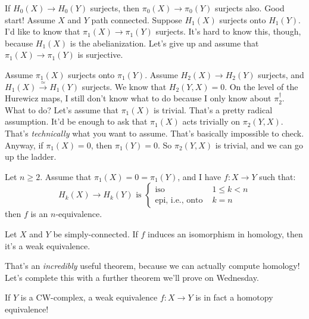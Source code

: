 If $H_0(X)\to H_0(Y)$ surjects, then $\pi_0(X)\to \pi_0(Y)$ surjects also. Good start! Assume $X$ and $Y$ path connected. Suppose $H_1(X)$ surjects onto $H_1(Y)$. I'd like to know that $\pi_1(X)\to\pi_1(Y)$ surjects. It's hard to know this, though, because $H_1(X)$ is the abelianization. Let's give up and assume that $\pi_1(X)\to \pi_1(Y)$ is surjective.

Assume $\pi_1(X)$ surjects onto $\pi_1(Y)$. Assume $H_2(X)\to H_2(Y)$ surjects, and $H_1(X)\xrightarrow{\simeq}H_1(Y)$ surjects. We know that $H_2(Y,X) = 0$. On the level of the Hurewicz maps, I still don't know what to do because I only know about $\pi_2^\dagger$. What to do? Let's assume that $\pi_1(X)$ is trivial. That's a pretty radical assumption. It'd be enough to ask that $\pi_1(X)$ acts trivially on $\pi_2(Y,X)$. That's \emph{technically} what you want to assume. That's basically impossible to check. Anyway, if $\pi_1(X) = 0$, then $\pi_1(Y) = 0$. So $\pi_2(Y,X)$ is trivial, and we can go up the ladder.
\begin{theorem}[J.~H.~C.~Whitehead 2]
    Let $n\geq 2$. Assume that $\pi_1(X) = 0 = \pi_1(Y)$, and I have $f:X\to Y$ such that:
\begin{equation*}
H_k(X)\to H_k(Y) \text{ is }\begin{cases}
\text{iso } & 1\leq k<n\\
\text{epi, i.e., onto } & k = n
\end{cases}
\end{equation*}
then $f$ is an $n$-equivalence.
\end{theorem}
\begin{corollary}
    Let $X$ and $Y$ be simply-connected. If $f$ induces an isomorphism in homology, then it's a weak equivalence.
\end{corollary}
That's an \emph{incredibly} useful theorem, because we can actually compute homology! Let's complete this with a further theorem we'll prove on Wednesday.
\begin{theorem}
    If $Y$ is a CW-complex, a weak equivalence $f:X\to Y$ is in fact a homotopy equivalence!
\end{theorem}
